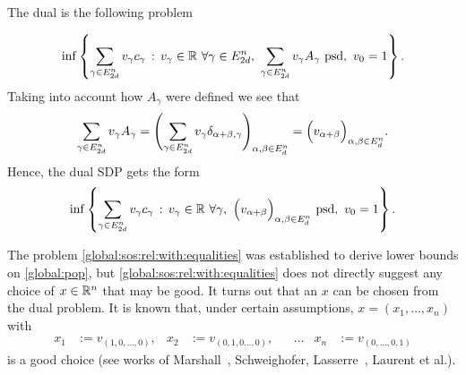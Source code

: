The dual is the following problem

\[
	\inf \setcond{ \sum_{\gamma \in E^n_{2d} } v_\gamma c_\gamma }{v_\gamma \in \R \ \forall \gamma \in E^n_{2d}, \ \sum_{\gamma \in E^n_{2d}} v_\gamma A_\gamma \ \text{psd}, \ v_0 = 1}.
\]
%
Taking into account how $A_\gamma$ were defined we see that 
\[
	\sum_{\gamma \in E^n_{2d}} v_\gamma A_\gamma = \Biggl( \sum_{\gamma \in E^n_{2d}} v_\gamma \delta_{\alpha + \beta,\gamma} \Biggr)_{\alpha, \beta \in E^n_d} = \Bigl( v_{\alpha+ \beta} \Bigr)_{\alpha, \beta \in E^n_d}.
\]
%
Hence, the dual SDP gets the form
\begin{equation}
	\label{global:sos:rel:with:equalities:simplified}
	\inf \setcond{ \sum_{\gamma \in E^n_{2d}} v_\gamma c_\gamma }{v_\gamma \in \R \ \forall \gamma, \ \Big(v_{\alpha+\beta}\Big)_{\alpha, \beta \in E^n_d} \ \text{psd}, \ v_0 = 1}.
\end{equation}
%
%
\begin{remark}
The problem \eqref{global:sos:rel:with:equalities} was established to derive lower bounds on \eqref{global:pop}, but \eqref{global:sos:rel:with:equalities} does not directly suggest any choice of $x \in \mathbb{R}^n$ that may be good. It turns out that an $x$ can be chosen from the dual problem. It is known that, under certain assumptions, $x=(x_1,\ldots,x_n)$ with 
\begin{align*}
 x_1 & := v_{(1,0,\ldots,0)}, & x_2 & := v_{(0,1,0\ldots,0)}, & & \ldots & x_n & := v_{(0,\ldots,0,1)}
\end{align*}
is a good choice (see works of Marshall~\cite[\S 10.5 \& \S 10.7]{marshall2008positivepolynomials}, Schweighofer, Lasserre~\cite[\S 6]{lasserre2015anintroduction}, Laurent et al.). 
\end{remark}
%

